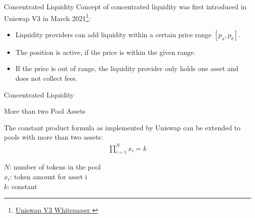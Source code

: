 \documentclass[]{beamer}
\begin{document}
\begin{frame}{Concentrated Liquidity}
	Concept of concentrated liquidity was first introduced in Uniswap V3 in March 2021\footnote{\href{https://uniswap.org/whitepaper-v3.pdf}{Uniswap V3 Whitepaper \link}}:
	\begin{itemize}
		\item<2-> Liquidity providers can add liquidity within a certain price range $[p_a, p_b]$.
		\item<3-> The position is active, if the price is within the given range.
		\item<4-> If the price is out of range, the liquidity provider only holds one asset and does not collect fees.
	\end{itemize}
	\vspace{0.5cm}
\end{frame}


\begin{frame}{Concentrated Liquidity}
	\begin{figure}[h!]
		\begin{center}
			
		\end{center}
	\end{figure}	
\end{frame}


\begin{frame}{More than two Pool Assets}

The constant product formula as implemented by Uniswap can be extended to pools with more than two assets:
		\begin{align*}
			\prod_{i=1}^N x_i= k
		\end{align*}
		
$N$: number of tokens in the pool\\
$x_i$: token amount for asset i\\
$k$: constant

\end{frame}
\end{document}
